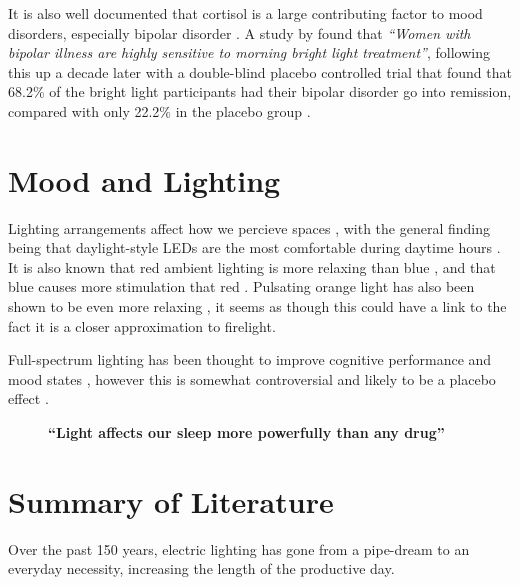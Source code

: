 It is also well documented that cortisol is a large contributing factor to mood disorders, especially bipolar disorder \citep{youngCortisolMoodDisorders2004}. A study by \citet{sitLightTherapyBipolar2007} found that \textit{``Women with bipolar illness are highly sensitive to morning bright light treatment''}, following this up a decade later with a double-blind placebo controlled trial that found that 68.2\% of the bright light participants had their bipolar disorder go into remission, compared with only 22.2\% in the placebo group \citep{sitAdjunctiveBrightLight2017}.

\section{Mood and Lighting}

Lighting arrangements affect how we percieve spaces \citep{durakImpactLightingArrangements2007}, with the general finding being that daylight-style LEDs are the most comfortable during daytime hours \citep{cajochenEffectDaylightLED2019}. It is also known that red ambient lighting is more relaxing than blue \citep{lauferPsychophysiologicalEffectsColoured2009}, and that blue causes more stimulation that red \citep{schweitzerInvestigationGenderAgerelated2016}. Pulsating orange light has also been shown to be even more relaxing \citep{wanInfluenceLightingColor2012}, it seems as though this could have a link to the fact it is a closer approximation to firelight.

Full-spectrum lighting has been thought to improve cognitive performance and mood states \citep{berryWorkEfficiencyMood1984}, however this is somewhat controversial and likely to be a placebo effect \citep{veitchDemandCharacteristicsFull1991}.

\begin{figure}[t]
\centering
\LARGE
\textbf{``Light affects our sleep more powerfully than any drug''}

\citep{czeislerPerspectiveCastingLight2013}
\end{figure}


\section{Summary of Literature}
\label{sec:LitSummary}

Over the past 150 years, electric lighting has gone from a pipe-dream to an everyday necessity, increasing the length of the productive day. 

